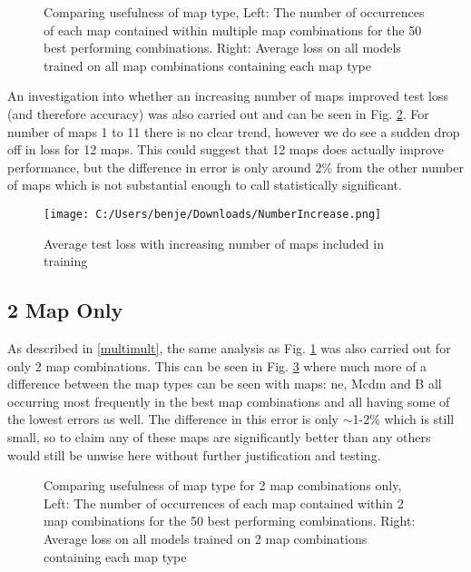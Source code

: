 \documentclass[11pt]{scrartcl}
\begin{document}
\begin{figure}[H]
\begin{center}
\end{center}
\caption{Comparing usefulness of map type, Left: The number of occurrences of each map contained within multiple map combinations for the 50 best performing combinations. Right: Average loss on all models trained on all map combinations containing each map type}
\label{NONE}
\end{figure}


An investigation into whether an increasing number of maps improved test loss (and therefore accuracy) was also carried out and can be seen in Fig. \ref{Incly}. For number of maps 1 to 11 there is no clear trend, however we do see a sudden drop off in loss for 12 maps. This could suggest that 12 maps does actually improve performance, but the difference in error is only around 2\% from the other number of maps which is not substantial enough to call statistically significant.

\begin{figure}[H]
\centering
\texttt{[image: C:/Users/benje/Downloads/NumberIncrease.png]}
\caption{Average test loss with increasing number of maps included in training}
\label{Incly}
\end{figure}



\subsection{2 Map Only}

As described in \ref{multimult}, the same analysis as Fig. \ref{NONE} was also carried out for only 2 map combinations. This can be seen in Fig. \ref{LAST?} where much more of a difference between the map types can be seen with maps: ne, Mcdm and B all occurring most frequently in the best map combinations and all having some of the lowest errors as well. The difference in this error is only $\sim$1-2\% which is still small, so to claim any of these maps are significantly better than any others would still be unwise here without further justification and testing.


\begin{figure}[H]
\begin{center}
\end{center}
\caption{Comparing usefulness of map type for 2 map combinations only, Left: The number of occurrences of each map contained within 2 map combinations for the 50 best performing combinations. Right: Average loss on all models trained on 2 map combinations containing each map type}
\label{LAST?}
\end{figure}
\end{document}
